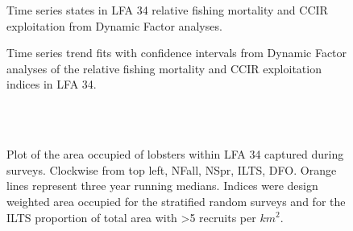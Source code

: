 \documentclass[11pt]{article}
\newcommand{\e}{\string~/bio.data/bio.lobster/figures/LFA3438Framework2019/} %
\begin{document}
   \begin{figure}
    \centering
        \caption{Time series states in LFA 34 relative fishing mortality and CCIR exploitation from Dynamic Factor analyses.}

    \end{figure}

\begin{figure}
    \centering
        \caption{Time series trend fits with confidence intervals from Dynamic Factor analyses of the relative fishing mortality and CCIR exploitation indices in LFA 34.}

    \end{figure}



    
\begin{figure}
        \centering
    \\
                \\
        
         \caption{Plot of the area occupied of lobsters within LFA 34 captured during surveys. Clockwise from top left, NFall, NSpr, ILTS, DFO.
         Orange lines represent three year running medians. Indices were design weighted area occupied for the stratified random surveys and for the ILTS proportion of total area with \textgreater 5 recruits per $km^2$.}
        \end{figure}

    
\end{document}
